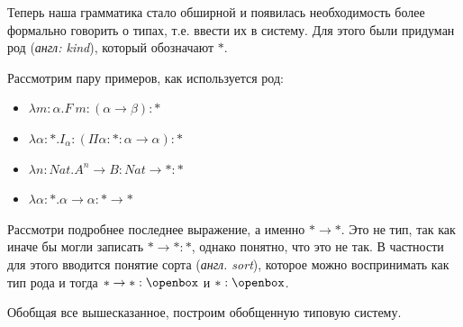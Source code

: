 \documentclass[12pt]{article}
\begin{document}
Теперь наша грамматика стало обширной и появилась необходимость более формально говорить о типах, т.е. ввести их в систему. Для этого были придуман род (\textit{англ: kind}), который обозначают $*$.

Рассмотрим пару примеров, как используется род:

\begin{itemize}
    \item $\lambda m : \alpha.F\ m : (\alpha \rightarrow \beta) : *$
    \item $\lambda \alpha : *.I_\alpha : (\Pi \alpha : * : \alpha \rightarrow \alpha) : *$
    \item $\lambda n : Nat . A^n \rightarrow B : Nat \rightarrow * : *$
    \item $\lambda \alpha : * . \alpha \rightarrow \alpha : * \rightarrow *$
\end{itemize}

Рассмотри подробнее последнее выражение, а именно $* \rightarrow *$. Это не тип, так как иначе бы могли записать $* \rightarrow * : *$, однако понятно, что это не так. В частности для этого вводится понятие сорта (\textit{англ. sort}), которое можно воспринимать как тип рода и тогда $* \rightarrow * : \openbox $ и $* : \openbox$.

Обобщая все вышесказанное, построим обобщенную типовую систему.
\end{document}
